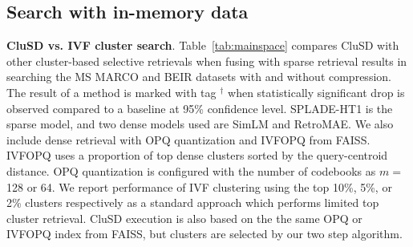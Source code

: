 \subsection{Search with in-memory data}
\textbf{CluSD vs. IVF  cluster search}.
\label{sect:eval0space}
Table~\ref{tab:mainspace} compares CluSD with other cluster-based selective retrievals when fusing with sparse retrieval results
in searching the MS MARCO and BEIR datasets with and without compression.  
The result of a method is marked with  tag $^\dag$ when
statistically significant drop is observed compared to  a baseline at 95\% confidence level. 
SPLADE-HT1 is  the sparse model, and two dense models used are SimLM and RetroMAE.
We also include dense retrieval with OPQ quantization  and  IVFOPQ from FAISS.
IVFOPQ uses a proportion of top dense clusters sorted by the query-centroid distance.
OPQ quantization is configured with  the number of codebooks as $m=$ 128 or 64.
We report performance of IVF clustering using the top 10\%, 5\%, or 2\% clusters respectively
as a standard approach which performs   limited top cluster retrieval.
CluSD execution is also based on the the same OPQ or  IVFOPQ index from  FAISS, but clusters are  selected  by our two step algorithm.

